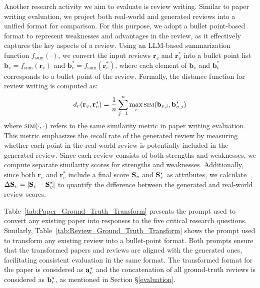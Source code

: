  Another research activity we aim to evaluate is review writing. Similar to paper writing evaluation, we project both real-world and generated reviews into a unified format for comparison. For this purpose, we adopt a bullet point-based format to represent weaknesses and advantages in the review, as it effectively captures the key aspects of a review. Using an LLM-based summarization function $ f_\text{sum}(\cdot) $, we convert the input reviews $ \mathbf{r}_v $ and $ \mathbf{r}^*_v $ into a bullet point list $ \mathbf{b}_v = f_\text{sum}(\mathbf{r}_v) $ and $ \mathbf{b}^*_v = f_\text{sum}(\mathbf{r}^*_v) $, where each element of $ \mathbf{b}_v $ and $ \mathbf{b}_v^* $ corresponds to a bullet point of the review. Formally, the distance function for review writing is computed as:
\begin{align}
\vspace{-1mm}
d_r(\mathbf{r}_v, \mathbf{r}^*_v) = \frac{1}{n} \sum_{j=1}^{n} \max_{i} \textsc{sim}(\mathbf{b}_{v,i}, \mathbf{b}^*_{v,j})
\label{review-score}
\vspace{-1mm}
\end{align}
where $ \textsc{sim}(\cdot, \cdot) $ refers to the same similarity metric in paper writing evaluation. This metric emphasizes the \textit{recall} rate of the generated review by measuring whether each point in the real-world review is potentially included in the generated review. Since each review consists of both strengths and weaknesses, we compute separate similarity scores for strengths and weaknesses. Additionally, since both $ \mathbf{r}_v $ and $ \mathbf{r}_v^* $ include a final score $\mathbf{S}_v$ and $\mathbf{S}^*_v$ as attributes, we calculate $ \Delta \mathbf{S}_v = |\mathbf{S}_v - \mathbf{S}_v^*| $ to quantify the difference between the generated and real-world review scores.


 Table~\ref{tab:Paper_Ground_Truth_Transform} presents the prompt used to convert any existing paper into responses to the five critical research questions. Similarly, Table~\ref{tab:Review_Ground_Truth_Transform} shows the prompt used to transform any existing review into a bullet-point format. Both prompts ensure that the transformed papers and reviews are aligned with the generated ones, facilitating consistent evaluation in the same format. The transformed format for the paper is considered as $\mathbf{a}_v^{*}$ and the concatenation of all ground-truth reviews is considered as $\mathbf{b}_v^{*}$, as mentioned in Section \S\ref{evaluation}.

